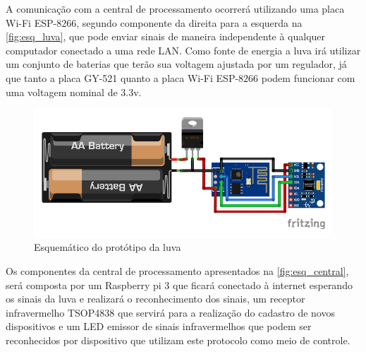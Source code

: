 A comunicação com a central de processamento ocorrerá utilizando uma placa Wi-Fi ESP-$8266$, segundo componente da direita para a esquerda na \autoref{fig:esq_luva}, que pode enviar sinais de maneira independente à qualquer computador conectado a uma rede LAN. Como fonte de energia a luva irá utilizar um conjunto de baterias que terão sua voltagem ajustada por um regulador, já que tanto a placa GY-521 quanto a placa Wi-Fi ESP-$8266$ podem funcionar com uma voltagem nominal de 3.3v.




\begin{figure}[ht]
    \centering
    \includegraphics{resources/esquematico_tcc_bb.pdf}
    \caption{Esquemático do protótipo da luva}
    \label{fig:esq_luva}
\end{figure}

Os componentes da central de processamento apresentados na \autoref{fig:esq_central}, será composta por um Raspberry pi 3 \cite{raspberry:pi3} que ficará conectado à internet esperando os sinais da luva e realizará o reconhecimento dos sinais, um receptor infravermelho TSOP4838 que servirá para a realização do cadastro de novos dispositivos e um LED emissor de sinais infravermelhos que podem ser reconhecidos por dispositivo que utilizam este protocolo como meio de controle.


